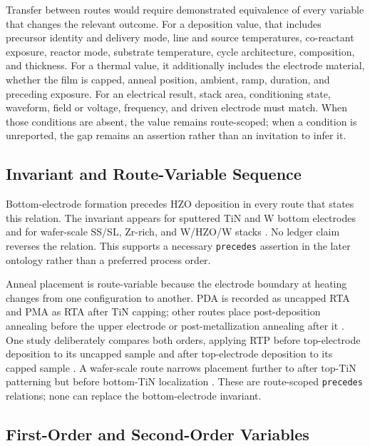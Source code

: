 \documentclass[11pt,a4paper]{report}
\begin{document}
Transfer between routes would require demonstrated equivalence of every variable that changes the relevant outcome. For a deposition value, that includes precursor identity and delivery mode, line and source temperatures, co-reactant exposure, reactor mode, substrate temperature, cycle architecture, composition, and thickness. For a thermal value, it additionally includes the electrode material, whether the film is capped, anneal position, ambient, ramp, duration, and preceding exposure. For an electrical result, stack area, conditioning state, waveform, field or voltage, frequency, and driven electrode must match. When those conditions are absent, the value remains route-scoped; when a condition is unreported, the gap remains an assertion rather than an invitation to infer it.

\subsection{Invariant and Route-Variable Sequence}
\label{sec:ald-sequence-invariance}

Bottom-electrode formation precedes HZO deposition in every route that states this relation. The invariant appears for sputtered TiN and W bottom electrodes and for wafer-scale SS/SL, Zr-rich, and W/HZO/W stacks \cite{kim2020tin,kaatranen2026unif,liu2025zrrich,kashir2021wake}. No ledger claim reverses the relation. This supports a necessary \texttt{precedes} assertion in the later ontology rather than a preferred process order.

Anneal placement is route-variable because the electrode boundary at heating changes from one configuration to another. PDA is recorded as uncapped RTA and PMA as RTA after TiN capping; other routes place post-deposition annealing before the upper electrode or post-metallization annealing after it \cite{song2021ferro,choi2022chamber,song2023seed}. One study deliberately compares both orders, applying RTP before top-electrode deposition to its uncapped sample and after top-electrode deposition to its capped sample \cite{zhang2015inductive}. A wafer-scale route narrows placement further to after top-TiN patterning but before bottom-TiN localization \cite{kaatranen2026unif}. These are route-scoped \texttt{precedes} relations; none can replace the bottom-electrode invariant.

\subsection{First-Order and Second-Order Variables}
\label{sec:ald-variable-order}
\end{document}
